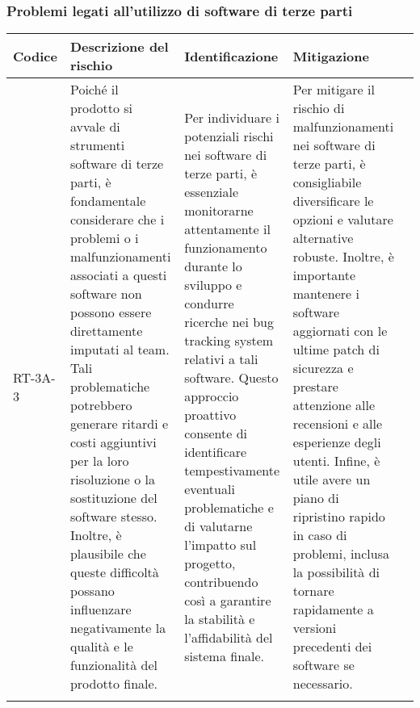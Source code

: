 \subsubsection{Problemi legati all'utilizzo di software di terze parti} \label{sec:swThirdParts}
\begin{table}[H]
    \centering
    \begin{tabularx}{\textwidth}{l>{\RaggedRight}X>{\RaggedRight}X>{\RaggedRight}X>{\RaggedRight}X}
    \toprule
    \rowcolor{gray!50}
    \textbf{Codice} & \textbf{Descrizione del rischio} & \textbf{Identificazione} & \textbf{Mitigazione} \\
    \midrule
    \addlinespace 
    RT-3A-3 & 
    Poiché il prodotto si avvale di strumenti software di terze parti, è fondamentale considerare che i problemi o i malfunzionamenti associati a questi software non possono essere direttamente imputati al team. Tali problematiche potrebbero generare ritardi e costi aggiuntivi per la loro risoluzione o la sostituzione del software stesso. Inoltre, è plausibile che queste difficoltà possano influenzare negativamente la qualità e le funzionalità del prodotto finale. &
    Per individuare i potenziali rischi nei software di terze parti, è essenziale monitorarne attentamente il funzionamento durante lo sviluppo e condurre ricerche nei bug tracking system relativi a tali software. Questo approccio proattivo consente di identificare tempestivamente eventuali problematiche e di valutarne l'impatto sul progetto, contribuendo così a garantire la stabilità e l'affidabilità del sistema finale.&
    Per mitigare il rischio di malfunzionamenti nei software di terze parti, è consigliabile diversificare le opzioni e valutare alternative robuste. Inoltre, è importante mantenere i software aggiornati con le ultime patch di sicurezza e prestare attenzione alle recensioni e alle esperienze degli utenti. Infine, è utile avere un piano di ripristino rapido in caso di problemi, inclusa la possibilità di tornare rapidamente a versioni precedenti dei software se necessario. \\
    \bottomrule
    \addlinespace 
    \end{tabularx}
\end{table}

